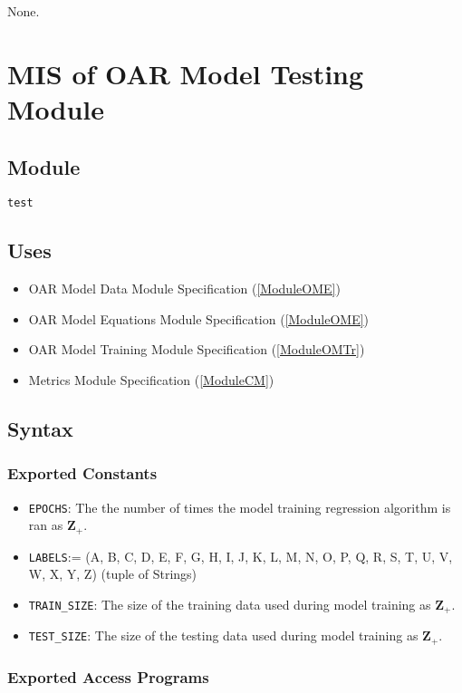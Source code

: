\documentclass[12pt, titlepage]{article}
\def\code#1{\texttt{#1}}
\begin{document}
None.

\section{MIS of OAR Model Testing Module} \label{ModuleOMTs} 

\subsection{Module}

\code{test}

\subsection{Uses}

\begin{itemize}
  \item OAR Model Data Module Specification (\ref{ModuleOME})
  \item OAR Model Equations Module Specification (\ref{ModuleOME})
  \item OAR Model Training Module Specification (\ref{ModuleOMTr})
  \item Metrics Module Specification (\ref{ModuleCM})
\end{itemize}

\subsection{Syntax}

\subsubsection{Exported Constants}

\begin{itemize}
\item \code{EPOCHS}: The the number of times the model training regression algorithm is ran as $\mathbf{Z}_{+}$.
\item \code{LABELS}:= (A, B, C, D, E, F, G, H, I, J, K, L, M, N, O, P, Q, R, S, T, U, V, W, X, Y, Z) (tuple of Strings)
\item \code{TRAIN\_SIZE}: The size of the training data used during model training as $\mathbf{Z}_{+}$.
\item \code{TEST\_SIZE}: The size of the testing data used during model training as $\mathbf{Z}_{+}$.
\end{itemize}

\subsubsection{Exported Access Programs}
\end{document}
